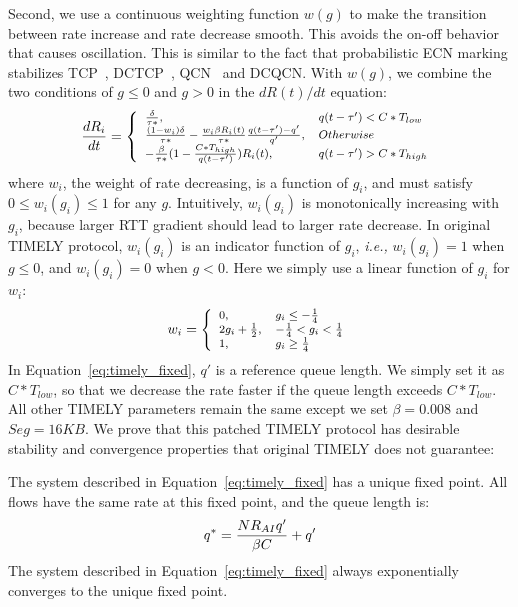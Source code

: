 Second, we use a continuous weighting function $w(g)$ to make the transition
between rate increase and rate decrease smooth. This avoids the on-off behavior
that causes oscillation.  This is similar to the fact that probabilistic ECN
marking stabilizes TCP~\cite{misra2000fluid}, DCTCP~\cite{dctcp-analysis},
QCN~\cite{qcn-analysis} and DCQCN. With $w(g)$, we combine the two conditions of
$g \le 0$ and $g>0$ in the $dR(t)/dt$ equation:
\begin{equation}
\small
\frac{{dR_i}}{{dt}} = \left\{ \begin{array}{ll}
\frac{\delta }{{\tau *}}, & q(t - \tau ') < C*{T_{low}}\\
\frac{{(1 - {w_i})\delta }}{{\tau *}} - \frac{{{w_i}\beta {R_i}(t)}}{{\tau *}}\frac{{q(t - \tau ') - q'}}{{q'}}, & Otherwise\\
 - \frac{\beta }{{\tau *}}(1 - \frac{{C*{T_{high}}}}{{q(t - \tau ')}})R_i(t), & q(t - \tau ') > C*{T_{high}}
\end{array} \right.\\
\label{eq:timely_fixed}
\end{equation}
where $w_i$, the weight of rate decreasing, is a function of $g_i$, and must satisfy $0 \le w_i(g_i) \le 1$ for any $g$. 
Intuitively, $w_i(g_i)$ is monotonically increasing with $g_i$, because larger RTT gradient should lead to larger 
rate decrease. In original TIMELY protocol, $w_i(g_i)$ is an indicator function of $g_i$, {\em i.e.,} 
$w_i(g_i)=1$ when $g \le 0$, and $w_i(g_i)=0$ when $g<0$. Here we simply use a linear function of $g_i$ for $w_i$:
\begin{equation}
\small
{w_i} = \left\{ \begin{array}{ll}
0, & {g_i \le  - \frac{1}{4}} \\
2{g_i} + \frac{1}{2}, & { - \frac{1}{4} < g_i < \frac{1}{4}} \\
1, & {g_i \ge \frac{1}{4}}
\end{array} \right.
\end{equation}
In Equation~\ref{eq:timely_fixed}, $q'$ is a reference queue length. We simply set it as $C*T_{low}$, 
so that we decrease the rate faster if the queue length exceeds $C*T_{low}$. All
other TIMELY parameters remain the same except we set $\beta=0.008$ and $Seg=16KB$. 
We prove that this patched TIMELY protocol has desirable stability and convergence properties
that original TIMELY does not guarantee:


\begin{thm}
The system described in Equation~\ref{eq:timely_fixed} has a unique fixed point.
All flows have the same rate at this fixed point, and the queue length is:
\begin{equation}
\small
{q^*} = \frac{{N{R_{AI}}q'}}{{\beta C}} + q'
\label{eq:timely_fixed_q}
\end{equation}
The system described in Equation~\ref{eq:timely_fixed} always exponentially converges to 
the unique  fixed point.
\end{thm}


